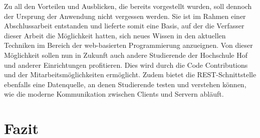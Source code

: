 \linebreak
Zu all den Vorteilen und Ausblicken, die bereits vorgestellt wurden, soll dennoch der Ursprung der Anwendung nicht vergessen werden. Sie ist im Rahmen einer Abschlussarbeit entstanden und lieferte somit eine Basis, auf der die Verfasser dieser Arbeit die Möglichkeit hatten, sich neues Wissen in den aktuellen Techniken im Bereich der web-basierten Programmierung anzueignen. Von dieser Möglichkeit sollen nun in Zukunft auch andere Studierende der Hochschule Hof und anderer Einrichtungen profitieren. Dies wird durch die Code Contributions und der Mitarbeitsmöglichkeiten ermöglicht. Zudem bietet die \ac{REST}-Schnittstelle ebenfalls eine Datenquelle, an denen Studierende testen und verstehen können, wie die moderne Kommunikation zwischen Clients und Servern abläuft.

\section{Fazit\label{sec:fazit}}

